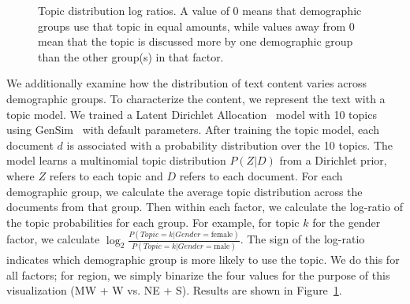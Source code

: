 \begin{figure}[t!]
\caption{Topic distribution log ratios. %
A value of 0 means that demographic groups use that topic in equal amounts, while values away from 0 mean that the topic is discussed more by one demographic group than the other group(s) in that factor.
}
\label{fig:vary}
\end{figure}

We additionally examine how the distribution of text content varies across demographic groups. To characterize the content, we represent the text with a topic model.
We trained a Latent Dirichlet Allocation~\cite{blei2003latent} model with 10 topics using GenSim~\cite{rehurek2010software} with default parameters.
After training the topic model, each document $d$ is associated with a probability distribution over the 10 topics. 
The model learns a multinomial topic distribution $P(Z|D)$ from a Dirichlet prior, where $Z$ refers to each topic and $D$ refers to each document.
For each demographic group, we calculate the average topic distribution across the documents from that group.
Then within each factor, we calculate the log-ratio of the topic probabilities for each group.
For example, for topic $k$ for the gender factor,
we calculate $\log_2 \frac{P(Topic=k|Gender=\textrm{female})}{P(Topic=k|Gender=\textrm{male})}$.
The sign of the log-ratio indicates which demographic group is more likely to use the topic.
We do this for all factors;
for region, we simply binarize the four values for the purpose of this visualization (MW + W vs. NE + S).
Results are shown in Figure~\ref{fig:vary}.


